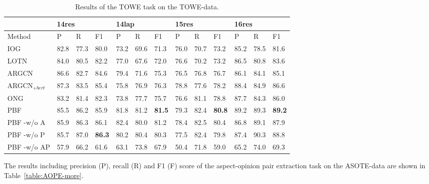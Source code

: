 \documentclass[11pt]{article}
\begin{document}
\begin{table*}
	\centering
	\begin{tabular}{|l|l|l|l|l|l|l|l|l|l|l|l|l|}
		\hline
		& \multicolumn{3}{l|}{14res}  & \multicolumn{3}{l|}{14lap}  & \multicolumn{3}{l|}{15res}  & \multicolumn{3}{l|}{16res}  \\ \hline
		Method          & P    & R    & F1            & P    & R    & F1            & P    & R    & F1            & P    & R    & F1            \\ \hline
		IOG             & 82.8 & 77.3 & 80.0            & 73.2 & 69.6 & 71.3          & 76.0   & 70.7 & 73.2          & 85.2 & 78.5 & 81.6          \\ \hline
		LOTN            & 84.0   & 80.5 & 82.2          & 77.0   & 67.6 & 72.0            & 76.6 & 70.2 & 73.2          & 86.5 & 80.8 & 83.6          \\ \hline
		ARGCN           & 86.6 & 82.7 & 84.6          & 79.4 & 71.6 & 75.3          & 76.5 & 76.8 & 76.7          & 86.1 & 84.1 & 85.1          \\ \hline
		ARGCN$_{+bert}$ & 87.3 & 83.5 & 85.4          & 75.8 & 76.9 & 76.3          & 78.8 & 77.6 & 78.2          & 88.4 & 84.9 & 86.6          \\ \hline
		ONG             & 83.2 & 81.4 & 82.3          & 73.8 & 77.7 & 75.7          & 76.6 & 81.1 & 78.8          & 87.7 & 84.3 & 86.0            \\ \hline
		PBF             & 85.5 & 86.2 & 85.9          & 81.8 & 81.2 & \textbf{81.5} & 79.3 & 82.4 & \textbf{80.8} & 89.2 & 89.3 & \textbf{89.2} \\ \hline
		PBF -w/o A      & 85.9 & 86.3 & 86.1          & 82.4 & 80.0   & 81.2          & 78.4 & 82.5 & 80.4          & 86.8 & 89.1 & 87.9          \\ \hline
		PBF -w/o P      & 85.7 & 87.0   & \textbf{86.3} & 80.2 & 80.4 & 80.3          & 77.5 & 82.4 & 79.8          & 87.4 & 90.3 & 88.8          \\ \hline
		PBF -w/o AP     & 57.9 & 66.2 & 61.6          & 63.1 & 73.8 & 67.9          & 50.4 & 71.8 & 59.0            & 65.2 & 74.0   & 69.3          \\ \hline
	\end{tabular}
	\caption{\label{table:TOWE-TOWE-data-prf} Results of the TOWE task on the TOWE-data.}
\end{table*}

The results including precision (P), recall (R) and F1 (F) score of the aspect-opinion pair extraction task  on the ASOTE-data are shown in Table~\ref{table:AOPE-more}.
\end{document}
